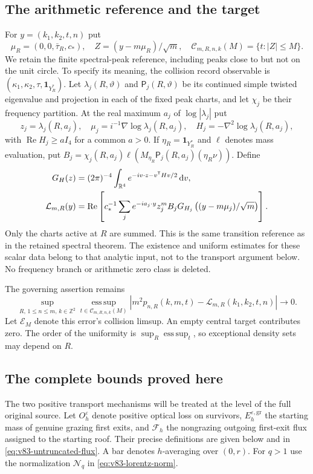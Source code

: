 \documentclass[11pt,reqno]{amsart}
\numberwithin{equation}{section}
\theoremstyle{definition}\newtheorem{definition}[theorem]{Definition}
\theoremstyle{remark}\newtheorem{remark}[theorem]{Remark}
\newcommand{\R}{\mathbb R}\newcommand{\Z}{\mathbb Z}\newcommand{\T}{\mathbb T}
\newcommand{\dd}{\,\mathrm d}\newcommand{\one}{\mathbf1}
\theoremstyle{definition}\newtheorem{inputstatement}[theorem]{Input statement}
\newcommand{\esssup}{\operatorname*{ess\,sup}}
\begin{document}
\subsection{The arithmetic reference and the target}
For $y=(k_1,k_2,t,n)$ put
\[
 \mu_R=(0,0,\bar\tau_R,c_*),\quad
 Z=(y-m\mu_R)/\sqrt m,\quad
 \mathcal C_{m,R,n,k}(M)=\{t:|Z|\le M\}.
\]
We retain the finite spectral-peak reference, including peaks close to
but not on the unit circle. To specify its meaning, the collision
record observable is $(\kappa_1,\kappa_2,\tau,\one_{Y_R^*})$.
Let $\lambda_j(R,\vartheta)$ and $\mathsf P_j(R,\vartheta)$ be its
continued simple twisted eigenvalue and projection in each of the
fixed peak charts, and let $\chi_j$ be their frequency partition.
At the real maximum $a_j$ of $\log|\lambda_j|$ put
\[
 z_j=\lambda_j(R,a_j),\quad
 \mu_j=i^{-1}\nabla\log\lambda_j(R,a_j),\quad
 H_j=-\nabla^2\log\lambda_j(R,a_j),
\]
with $\operatorname{Re}H_j\ge aI_4$ for a common $a>0$. If
$\eta_R=\one_{Y_R^*}$ and $\ell$ denotes mass evaluation, put
$B_j=\chi_j(R,a_j)\ell(M_{\eta_R}\mathsf P_j(R,a_j)(\eta_R\nu))$.
Define
\begin{align}
 G_H(z)&=(2\pi)^{-4}\int_{\R^4}e^{-iv\cdot z-v^{\mathsf T}Hv/2}\dd v,
 \notag\\
 \mathcal L_{m,R}(y)&=\operatorname{Re}\left[
 c_*^{-1}\sum_j e^{-ia_j\cdot y}z_j^m B_j
      G_{H_j}\left((y-m\mu_j)/\sqrt m\right)\right].
 \label{eq:v76-reference}
\end{align}
Only the charts active at $R$ are summed. This is the same transition
reference as in the retained spectral theorem. The existence and
uniform estimates for these scalar data belong to that analytic
input, not to the transport argument below. No frequency branch or
arithmetic zero class is deleted.

The governing assertion remains
\begin{equation}\label{eq:v76-target}
 \sup_{R,\,1\le n\le m,\,k\in\Z^2}
 \esssup_{t\in\mathcal C_{m,R,n,k}(M)}
 |m^2p_{n,R}(k,m,t)-\mathcal L_{m,R}(k_1,k_2,t,n)|\longrightarrow0.
\end{equation}
Let $\mathcal E_M$ denote this error's collision limsup. An empty
central target contributes zero. The order of the uniformity is
$\sup_R\esssup_t$, so exceptional density sets may depend on $R$.

\subsection{The complete bounds proved here}
The two positive transport mechanisms will be treated at the level of
the full original source. Let $O_h^\varepsilon$ denote positive optical
loss on survivors, $E_h^{\varepsilon,\mathrm{gr}}$ the starting mass of
genuine grazing first exits, and $\mathcal F_h$ the nongrazing outgoing
first-exit flux assigned to the starting roof. Their precise definitions
are given below and in \eqref{eq:v83-untruncated-flux}. A bar denotes
$h$-averaging over $(0,r)$. For $q>1$ use the normalization
$\mathcal N_q$ in \eqref{eq:v83-lorentz-norm}.
\end{document}
